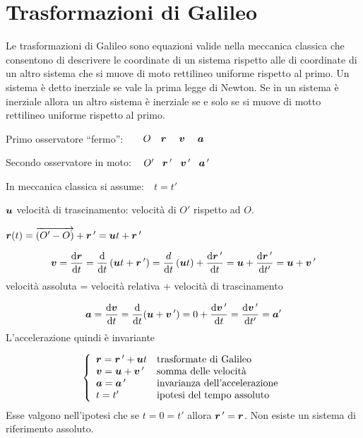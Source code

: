 \section{Trasformazioni di Galileo}
Le trasformazioni di Galileo sono equazioni valide nella meccanica classica che consentono di descrivere le coordinate di un sistema rispetto alle di coordinate di un altro sistema che si muove di moto rettilineo uniforme rispetto al primo. Un sistema è detto inerziale se vale la prima legge di Newton. Se in un sistema è inerziale allora un altro sistema è inerziale se e solo se si muove di motto rettilineo uniforme rispetto al primo.
\newline

Primo osservatore ``fermo'':$\qquad O\quad\boldsymbol{r}\quad\;\boldsymbol{v}\quad\;\boldsymbol{a}$

Secondo osservatore in moto:$\:\quad O'\quad\!\boldsymbol{r}\,'\quad\!\boldsymbol{v}\,'\quad\!\boldsymbol{a}\,'$

In meccanica classica si assume:$\quad t=t'$

$\boldsymbol{u}$ velocità di trascinamento: velocità di $O'$ rispetto ad $O$.
\begin{legge}
$\boldsymbol{r}(t)=\overrightarrow{\left(O'-O\right)}+\boldsymbol{r}\,'=\boldsymbol{u}
t+\boldsymbol{r}\,'$
\end{legge}
\begin{legge}
\[\boldsymbol{v}=\frac{\mathrm{d}\boldsymbol{r}}{\mathrm{d} t}=\frac{\mathrm{d}}{\mathrm{d} t}\left(\boldsymbol{u}
t+\boldsymbol{r}\,'\right)=\frac{d}{\mathrm{d} t}\left(\boldsymbol{u}
t\right)+\frac{\mathrm{d}\boldsymbol{r}\,'}{\mathrm{d} t}=\boldsymbol{u}+\frac{\mathrm{d}\boldsymbol{r}\,'}{\mathrm{d}
t'}=\boldsymbol{u}+\boldsymbol{v}\,'\]
velocità assoluta = velocità relativa + velocità di trascinamento
\end{legge}
\begin{legge}
\[\boldsymbol{a}=\frac{\mathrm{d} \boldsymbol{v}}{\mathrm{d} t}=\frac{\mathrm{d}}{\mathrm{d} t}(\boldsymbol{u}+\boldsymbol{v}\,')=0+\frac{\mathrm{d} \boldsymbol{v}\,'}{\mathrm{d} t}=\frac{\mathrm{d} \boldsymbol{v}\,'}{\mathrm{d}
t'}=\boldsymbol{a}'\]
L'accelerazione quindi è invariante
\end{legge}
\[\left\{\begin{array}{ll}
\boldsymbol{r}=\boldsymbol{r}\,'+\boldsymbol{u} t&\text{trasformate di Galileo}\\
\boldsymbol{v}=\boldsymbol{u}+\boldsymbol{v}\,'&\text{somma delle velocità}\\
\boldsymbol{a}=\boldsymbol{a}\,'&\text{invarianza dell'accelerazione}\\
t=t'&\text{ipotesi del tempo assoluto}\\
\end{array}\right.\]
Esse valgono nell'ipotesi che se $t=0=t'$ allora $\boldsymbol{r}\,'=\boldsymbol{r}$.
Non esiste un sistema di riferimento assoluto.
